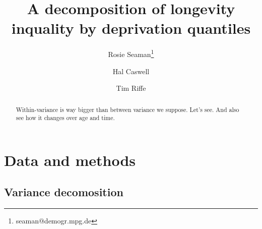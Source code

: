 \documentclass[12pt,oneside,a4paper]{article} %
\theoremstyle{definition}
\begin{document}
\title{A decomposition of longevity inquality by deprivation quantiles}
\author[1]{Rosie Seaman\thanks{seaman@demogr.mpg.de}}
\author[2]{Hal Caswell}
\author[1]{Tim Riffe}


\maketitle

\begin{abstract}
Within-variance is way bigger than between variance we suppose. Let's see. And
also see how it changes over age and time.
\end{abstract}

\section{Data and methods}

\subsection{Variance decomosition}
\end{document}
